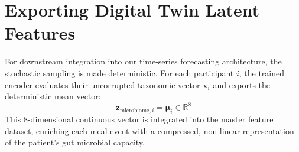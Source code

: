 \section{Exporting Digital Twin Latent Features}
For downstream integration into our time-series forecasting architecture, the stochastic sampling is made deterministic. For each participant $i$, the trained encoder evaluates their uncorrupted taxonomic vector $\mathbf{x}_i$ and exports the deterministic mean vector:
\begin{equation}
    \mathbf{z}_{\text{microbiome}, i} = \boldsymbol{\mu}_i \in \mathbb{R}^8
\end{equation}
This 8-dimensional continuous vector is integrated into the master feature dataset, enriching each meal event with a compressed, non-linear representation of the patient's gut microbial capacity.
